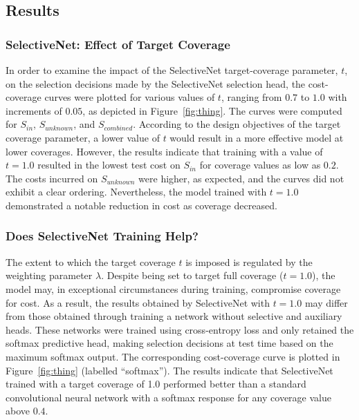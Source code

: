 \subsection{Results}
\subsubsection{SelectiveNet: Effect of Target Coverage}
In order to examine the impact of the SelectiveNet target-coverage parameter, $t$, on the selection decisions made by the SelectiveNet selection head, the cost-coverage curves were plotted for various values of $t$, ranging from $0.7$ to $1.0$ with increments of $0.05$, as depicted in Figure~\ref{fig:thing}. The curves were computed for $S_{in}$, $S_{unknown}$, and $S_{combined}$. According to the design objectives of the target coverage parameter, a lower value of $t$ would result in a more effective model at lower coverages. However, the results indicate that training with a value of $t=1.0$ resulted in the lowest test cost on $S_{in}$ for coverage values as low as $0.2$. The costs incurred on $S_{unknown}$ were higher, as expected, and the curves did not exhibit a clear ordering. Nevertheless, the model trained with $t=1.0$ demonstrated a notable reduction in cost as coverage decreased.

\subsubsection{Does SelectiveNet Training Help?}
The extent to which the target coverage $t$ is imposed is regulated by the weighting parameter $\lambda$. Despite being set to target full coverage ($t=1.0$), the model may, in exceptional circumstances during training, compromise coverage for cost. As a result, the results obtained by SelectiveNet with $t=1.0$ may differ from those obtained through training a network without selective and auxiliary heads. These networks were trained using cross-entropy loss and only retained the softmax predictive head, making selection decisions at test time based on the maximum softmax output. The corresponding cost-coverage curve is plotted in Figure~\ref{fig:thing} (labelled “softmax”). The results indicate that SelectiveNet trained with a target coverage of 1.0 performed better than a standard convolutional neural network with a softmax response for any coverage value above $0.4$.

